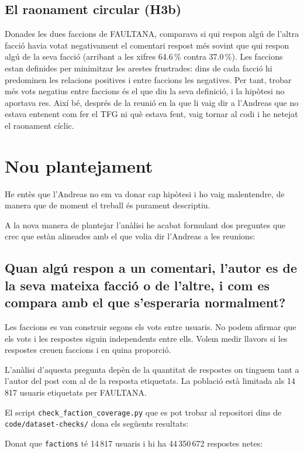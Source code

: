 \documentclass[11pt,a4paper]{article}
\newcommand{\code}[1]{\texttt{\small #1}}
\begin{document}
\subsection{El raonament circular (H3b)}

Donades les dues faccions de FAULTANA, comparava si qui respon algú de l'altra facció havia votat negativament el comentari respost més sovint que qui respon algú de la seva facció (arribant a les xifres 64.6\,\% contra 37.0\,\%). Les faccions estan definides per minimitzar les arestes frustrades: dins de cada facció hi predominen les relacions positives i entre faccions les negatives. Per tant, trobar més vots negatius entre faccions és el que diu la seva definició, i la hipòtesi no aportava res. Així bé, després de la reunió en la que li vaig dir a l'Andreas que no estava entenent com fer el TFG ni què estava fent, vaig tornar al codi i he netejat el raonament cíclic.

\section{Nou plantejament}

He entès que l'Andreas no em va donar cap hipòtesi i ho vaig malentendre, de manera que de moment el treball és purament descriptiu.

A la nova manera de plantejar l'anàlisi he acabat formulant dos preguntes que crec que estàn alineades amb el que volia dir l'Andreas a les reunions:

\subsection{Quan algú respon a un comentari, l'autor es de la seva mateixa facció o de l'altre, i com es compara amb el que s'esperaria normalment?}

Les faccions es van construir segons els vots entre usuaris. No podem afirmar que els vots i les respostes siguin independents entre ells. Volem medir llavors si les respostes creuen faccions i en quina proporció.

L'anàlisi d'aquesta pregunta depèn de la quantitat de respostes on tinguem tant a l'autor del post com al de la resposta etiquetats. La població està limitada als 14\,817 usuaris etiquetats per FAULTANA.

El script \code{check\_faction\_coverage.py} que es pot trobar al repositori dins de \code{code/dataset-checks/} dona els següents resultats:

Donat que \code{factions} té 14\,817 usuaris i hi ha 44\,350\,672 respostes netes:
\end{document}
